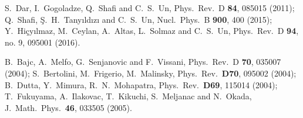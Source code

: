 \documentclass[12pt]{article}
\begin{document}
\begin{thebibliography}{99}
  S.~Dar, I.~Gogoladze, Q.~Shafi and C.~S.~Un,
  Phys.\ Rev.\ D {\bf 84}, 085015 (2011);
  Q.~Shafi, Ş.~H.~Tanyıldızı and C.~S.~Un,
  Nucl.\ Phys.\ B {\bf 900}, 400 (2015);
  Y.~Hiçyılmaz, M.~Ceylan, A.~Altas, L.~Solmaz and C.~S.~Un,
  Phys.\ Rev.\ D {\bf 94}, no. 9, 095001 (2016).


  B.~Bajc, A.~Melfo, G.~Senjanovic and F.~Vissani,
  Phys.\ Rev.\  D {\bf 70}, 035007 (2004);
  S.~Bertolini, M.~Frigerio, M.~Malinsky,
  Phys.\ Rev.\  {\bf D70}, 095002 (2004);
  B.~Dutta, Y.~Mimura, R.~N.~Mohapatra,
  Phys.\ Rev.\  {\bf D69}, 115014 (2004);
  T.~Fukuyama, A.~Ilakovac, T.~Kikuchi, S.~Meljanac and N.~Okada,
  J.\ Math.\ Phys.\  {\bf 46}, 033505 (2005).


\end{thebibliography}
\end{document}
